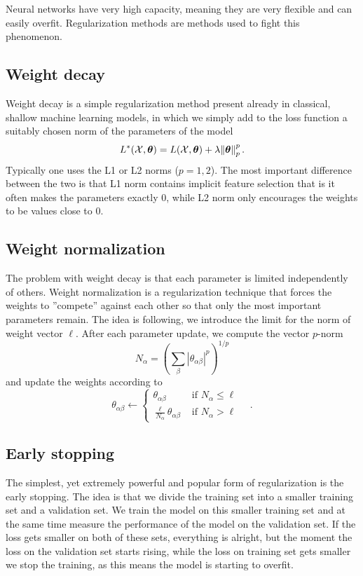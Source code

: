 \documentclass{myclass}
\begin{document}
Neural networks have very high capacity, meaning they are very flexible and can easily overfit.
Regularization methods are methods used to fight this phenomenon.


\subsection{Weight decay}

Weight decay is a simple regularization method present already in classical, shallow machine
learning models, in which we simply add to the loss function a suitably chosen norm of the
parameters of the model
\[
   L^*(\mathcal{X}, \bm{\theta}) = L(\mathcal{X}, \bm{\theta}) + \lambda \norm{\bm{\theta}}_p^p\,.
\]
Typically one uses the L1 or L2 norms (\(p=1,2\)). The most important difference between the two is
that L1 norm contains implicit feature selection that is it often makes the parameters exactly 0,
while L2 norm only encourages the weights to be values close to 0. 


\subsection{Weight normalization}

The problem with weight decay is that each parameter is limited independently of others. Weight
normalization is a regularization technique that forces the weights to ''compete'' against each
other so that only the most important parameters remain. The idea is following, we introduce the
limit for the norm of weight vector \(\ell\). After each parameter update, we compute the vector
\(p\)-norm
\[
   N_{\alpha} = \left( \sum_{\beta} \left|\theta_{\alpha\beta}\right|^p \right)^{1/p}
\]
and update the weights according to
\[
   \theta_{\alpha\beta} \gets \begin{cases} 
                           \theta_{\alpha\beta}                            &\text{ if \(N_\alpha \leq \ell\)}\\
                           \frac{\ell}{N_\alpha} \theta_{\alpha\beta}   &\text{ if \(N_\alpha > \ell\)}
   \end{cases}\quad.
\]


\subsection{Early stopping}

The simplest, yet extremely powerful and popular form of regularization is the early stopping. The
idea is that we divide the training set into a smaller training set and a validation set. We train
the model on this smaller training set and at the same time measure the performance of the model on
the validation set. If the loss gets smaller on both of these sets, everything is alright, but the
moment the loss on the validation set starts rising, while the loss on training set gets smaller we
stop the training, as this means the model is starting to overfit.
\end{document}
